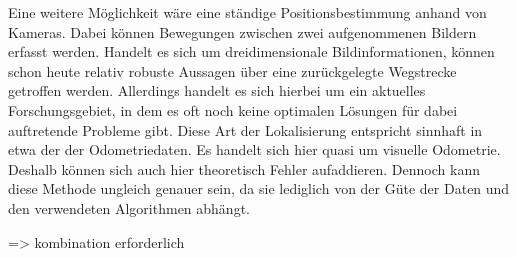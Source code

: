 Eine weitere Möglichkeit wäre eine ständige Positionsbestimmung anhand von Kameras. Dabei können Bewegungen zwischen zwei aufgenommenen Bildern erfasst werden. Handelt es sich um dreidimensionale Bildinformationen, können schon heute relativ robuste Aussagen über eine zurückgelegte Wegstrecke getroffen werden. Allerdings handelt es sich hierbei um ein aktuelles Forschungsgebiet, in dem es oft noch keine optimalen Lösungen für dabei auftretende Probleme gibt. Diese Art der Lokalisierung entspricht sinnhaft in etwa der der Odometriedaten. Es handelt sich hier quasi um visuelle Odometrie. Deshalb können sich auch hier theoretisch Fehler aufaddieren. Dennoch kann diese Methode ungleich genauer sein, da sie lediglich von der Güte der Daten und den verwendeten Algorithmen abhängt.

{\color{red}=> kombination erforderlich}